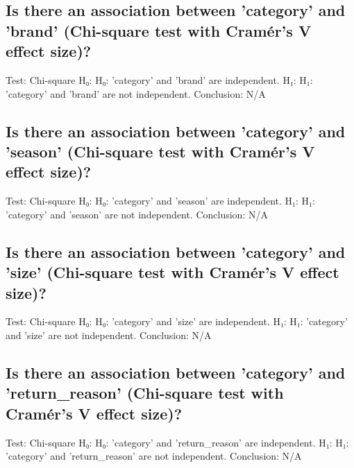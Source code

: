 \documentclass{article}%
\begin{document}
%
\subsection{Is there an association between 'category' and 'brand' (Chi{-}square test with Cramér’s V effect size)?}%
\label{subsec:Isthereanassociationbetweencategoryandbrand(Chi{-}squaretestwithCramrsVeffectsize)?}%
Test: Chi{-}square\newline%
H₀: H₀: 'category' and 'brand' are independent.\newline%
H₁: H₁: 'category' and 'brand' are not independent.\newline%
Conclusion: N/A

%
\subsection{Is there an association between 'category' and 'season' (Chi{-}square test with Cramér’s V effect size)?}%
\label{subsec:Isthereanassociationbetweencategoryandseason(Chi{-}squaretestwithCramrsVeffectsize)?}%
Test: Chi{-}square\newline%
H₀: H₀: 'category' and 'season' are independent.\newline%
H₁: H₁: 'category' and 'season' are not independent.\newline%
Conclusion: N/A

%
\subsection{Is there an association between 'category' and 'size' (Chi{-}square test with Cramér’s V effect size)?}%
\label{subsec:Isthereanassociationbetweencategoryandsize(Chi{-}squaretestwithCramrsVeffectsize)?}%
Test: Chi{-}square\newline%
H₀: H₀: 'category' and 'size' are independent.\newline%
H₁: H₁: 'category' and 'size' are not independent.\newline%
Conclusion: N/A

%
\subsection{Is there an association between 'category' and 'return\_reason' (Chi{-}square test with Cramér’s V effect size)?}%
\label{subsec:Isthereanassociationbetweencategoryandreturnreason(Chi{-}squaretestwithCramrsVeffectsize)?}%
Test: Chi{-}square\newline%
H₀: H₀: 'category' and 'return\_reason' are independent.\newline%
H₁: H₁: 'category' and 'return\_reason' are not independent.\newline%
Conclusion: N/A
\end{document}
